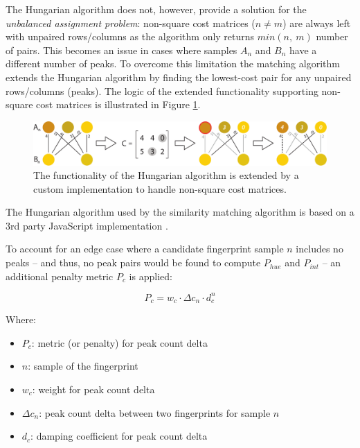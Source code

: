 \documentclass[thesis.tex]{subfiles}
\begin{document}
The Hungarian algorithm does not, however, provide a solution for the \emph{unbalanced assignment problem}: non-square cost matrices ($n \neq m$) are always left with unpaired rows/columns as the algorithm only returns $min (n,\ m)$ number of pairs. This becomes an issue in cases where samples $A_n$ and $B_n$ have a different number of peaks. To overcome this limitation the matching algorithm extends the Hungarian algorithm by finding the lowest-cost pair for any unpaired rows/columns (peaks). The logic of the extended functionality supporting non-square cost matrices is illustrated in Figure \ref{figure:hungarian-algorithm-extended}.

\begin{figure}[h]
\centering \includegraphics[width=\textwidth,height=\textheight,keepaspectratio=true]{images/design_implementation/hungarian_algorithm_ext}
\caption{The functionality of the Hungarian algorithm is extended by a custom implementation to handle non-square cost matrices.\label{figure:hungarian-algorithm-extended}}
\end{figure}

\noindent The Hungarian algorithm used by the similarity matching algorithm is based on a 3rd party JavaScript implementation \cite{munkres-js}.

To account for an edge case where a candidate fingerprint sample $n$ includes no peaks -- and thus, no peak pairs would be found to compute $P_{hue}$ and $P_{int}$ -- an additional penalty metric $P_c$ is applied:

\begin{equation}
\label{equation:similarity-metric-no-peaks}
	P_c = w_c \cdot \Delta{c_n} \cdot d_c^n
\end{equation}

Where:
\begin{itemize}[label=]
	\setlength\itemsep{0.10em}
    \item $P_c$: metric (or penalty) for peak count delta
    \item $n$: sample of the fingerprint
    \item $w_c$: weight for peak count delta
    \item $\Delta{c_n}$: peak count delta between two fingerprints for sample $n$
    \item $d_c$: damping coefficient for peak count delta
\end{itemize}
\end{document}
